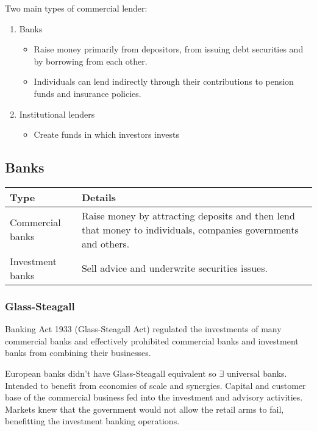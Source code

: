 \documentclass[
]{article}
\providecommand{\tightlist}{%
  \setlength{\itemsep}{0pt}\setlength{\parskip}{0pt}}
\begin{document}
Two main types of commercial lender:

\begin{enumerate}
\tightlist
\item
  Banks

  \begin{itemize}
  \tightlist
  \item
    Raise money primarily from depositors, from issuing debt securities
    and by borrowing from each other.
  \item
    Individuals can lend indirectly through their contributions to
    pension funds and insurance policies.
  \end{itemize}
\item
  Institutional lenders

  \begin{itemize}
  \tightlist
  \item
    Create funds in which investors invests
  \end{itemize}
\end{enumerate}

\hypertarget{banks}{%
\subsection{Banks}\label{banks}}

\begin{longtable}[]{@{}ll@{}}
\toprule()
Type & Details \\
\midrule()
\endhead
Commercial banks & Raise money by attracting deposits and then lend that
money to individuals, companies governments and others. \\
Investment banks & Sell advice and underwrite securities issues. \\
\bottomrule()
\end{longtable}

\hypertarget{glass-steagall}{%
\subsubsection{Glass-Steagall}\label{glass-steagall}}

Banking Act 1933 (Glass-Steagall Act) regulated the investments of many
commercial banks and effectively prohibited commercial banks and
investment banks from combining their businesses.

European banks didn't have Glass-Steagall equivalent so {\(\exists\)}
universal banks. Intended to benefit from economies of scale and
synergies. Capital and customer base of the commercial business fed into
the investment and advisory activities. Markets knew that the government
would not allow the retail arms to fail, benefitting the investment
banking operations.
\end{document}
